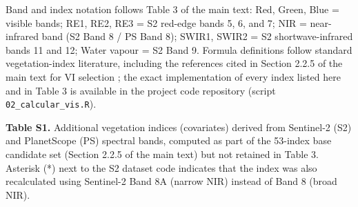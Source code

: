 \documentclass[
  english,
  review,
  number,
  sort,compress,
  authoryear,
  3p]{elsarticle}
\begin{document}
Band and index notation follows Table 3 of the main text: Red, Green,
Blue = visible bands; RE1, RE2, RE3 = S2 red-edge bands 5, 6, and 7; NIR
= near-infrared band (S2 Band 8 / PS Band 8); SWIR1, SWIR2 = S2
shortwave-infrared bands 11 and 12; Water vapour = S2 Band 9. Formula
definitions follow standard vegetation-index literature, including the
references cited in Section 2.2.5 of the main text for VI selection
\citep{Peng2023, Segarra2022, Uribeetxebarria2023, Wang2022, Wu2008, Zheng2017};
the exact implementation of every index listed here and in Table 3 is
available in the project code repository (script
\texttt{02\_calcular\_vis.R}).

\textbf{Table S1.} Additional vegetation indices (covariates) derived
from Sentinel-2 (S2) and PlanetScope (PS) spectral bands, computed as
part of the 53-index base candidate set (Section 2.2.5 of the main text)
but not retained in Table 3. Asterisk (*) next to the S2 dataset code
indicates that the index was also recalculated using Sentinel-2 Band 8A
(narrow NIR) instead of Band 8 (broad NIR).
\end{document}
